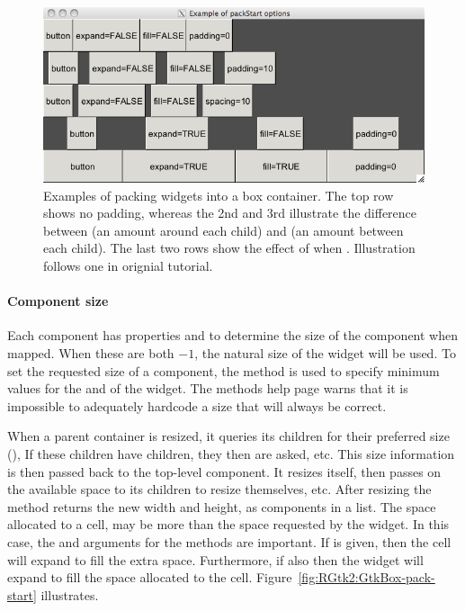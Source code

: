 \begin{figure}
  \centering
  \includegraphics[width=.85\textwidth]{ex-RGtk2-pack-start}
  \caption{Examples of packing widgets into a box container. The top
    row shows no padding, whereas the 2nd and 3rd illustrate the
    difference between  (an amount around each child)
    and  (an amount between each child). The last two
    rows show the effect of  when . Illustration
    follows one in orignial \GTK\/ tutorial.}
  \label{fig:RGtk2-pack-start}
\end{figure}




\paragraph{Component size}
Each component has properties  and  to determine the size of the component when mapped. When these are both $-1$, the natural size of the widget will be used. To set the requested size of a component, the method  is used to specify minimum values for the and  of the widget. The methods help page warns that it is impossible to adequately hardcode a size that will always be correct.

When a parent container is resized, it queries its children for their
preferred size (), If these children
have children, they then are asked, etc. This size
information is then passed back to the top-level component. It resizes
itself, then passes on the available space to its children to resize
themselves, etc. After resizing the 
method returns the new width and height, as components in a list.
The space allocated to a cell, may be more than the space requested by
the widget. In this case, the  and
 arguments for the  methods
are important. If  is given, then the cell will
expand to fill the extra space. Furthermore, if also  then
the widget will expand to fill the space allocated to the cell.
Figure~\ref{fig:RGtk2:GtkBox-pack-start} illustrates.


